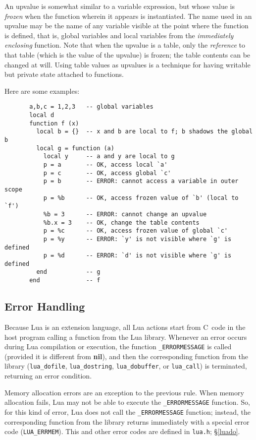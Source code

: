 \documentclass[11pt]{article}
\makeatletter
\newcommand{\See}[1]{\S\ref{#1}}
\newcommand{\nil}{{\bf nil}}
\newcommand{\DefLIB}[1]{\index{#1@{\tt #1}}}
\makeatother
\begin{document}
An upvalue is somewhat similar to a variable expression,
but whose value is \emph{frozen} when the function wherein it
appears is instantiated.
The name used in an upvalue may be the name of any variable visible
at the point where the function is defined,
that is,
global variables and local variables
from the \emph{immediately enclosing} function.
Note that when the upvalue is a table,
only the \emph{reference} to that table
(which is the value of the upvalue) is frozen;
the table contents can be changed at will.
Using table values as upvalues is a technique for having
writable but private state attached to functions.

Here are some examples:
\begin{verbatim}
       a,b,c = 1,2,3   -- global variables
       local d
       function f (x)
         local b = {}  -- x and b are local to f; b shadows the global b
         local g = function (a)
           local y     -- a and y are local to g
           p = a       -- OK, access local `a'
           p = c       -- OK, access global `c'
           p = b       -- ERROR: cannot access a variable in outer scope
           p = %b      -- OK, access frozen value of `b' (local to `f')
           %b = 3      -- ERROR: cannot change an upvalue
           %b.x = 3    -- OK, change the table contents
           p = %c      -- OK, access frozen value of global `c'
           p = %y      -- ERROR: `y' is not visible where `g' is defined
           p = %d      -- ERROR: `d' is not visible where `g' is defined
         end           -- g
       end             -- f
\end{verbatim}


\subsection{Error Handling} \label{error}

Because Lua is an extension language,
all Lua actions start from C~code in the host program
calling a function from the Lua library.
Whenever an error occurs during Lua compilation or execution,
the function \verb|_ERRORMESSAGE| is called \DefLIB{_ERRORMESSAGE}
(provided it is different from \nil),
and then the corresponding function from the library
(\verb|lua_dofile|, \verb|lua_dostring|,
\verb|lua_dobuffer|, or \verb|lua_call|)
is terminated, returning an error condition.

Memory allocation errors are an exception to the previous rule.
When memory allocation fails, Lua may not be able to execute the
\verb|_ERRORMESSAGE| function.
So, for this kind of error, Lua does not call
the \verb|_ERRORMESSAGE| function;
instead, the corresponding function from the library
returns immediately with a special error code (\verb|LUA_ERRMEM|).
This and other error codes are defined in \verb|lua.h|;
\See{luado}.
\end{document}
